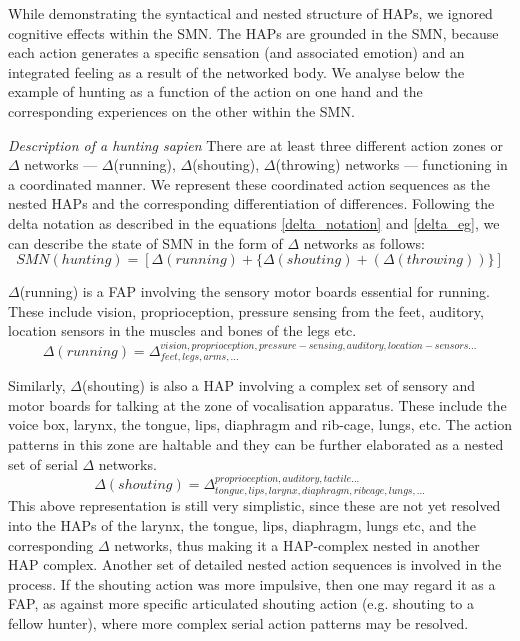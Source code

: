 While demonstrating the syntactical and nested structure of HAPs, we ignored cognitive effects within the SMN. The HAPs are grounded in the SMN, because each action generates a specific sensation (and associated emotion) and an integrated feeling as a result of the networked body. We analyse below the example of hunting as a function of the action on one hand and the corresponding experiences on the other within the SMN.

\emph{Description of a hunting sapien}
There are at least three different action zones or $\Delta$ networks --- $\Delta$(running), $\Delta$(shouting), $\Delta$(throwing) networks --- functioning in a coordinated manner. We represent these coordinated action sequences as the nested HAPs and the corresponding differentiation of differences. Following the delta notation as described in the equations \ref{delta_notation} and \ref{delta_eg}, we can describe the state of SMN in the form of $\Delta$ networks as follows:
\begin{equation}\label{running-eq}
SMN(hunting)= [\Delta(running) + \{\Delta(shouting) + (\Delta(throwing))\}]
\end{equation}

$\Delta$(running) is a FAP involving the sensory motor boards essential for running. These include vision, proprioception, pressure sensing from the feet, auditory, location sensors in the muscles and bones of the legs etc.
\begin{equation}\label{running-eq}
\Delta(running) = \Delta^{vision, proprioception, pressure-sensing, auditory, location-sensors...}_{feet, legs, arms,...}    
\end{equation}

Similarly, $\Delta$(shouting) is also a HAP involving a complex set of sensory and motor boards for talking at the zone of vocalisation apparatus. These include the voice box, larynx, the tongue, lips, diaphragm and rib-cage, lungs, etc. The action patterns in this zone are haltable and they can be further elaborated as a nested set of serial $\Delta$ networks.
\begin{equation}\label{shouting-eq}
\Delta(shouting) = \Delta^{proprioception, auditory, tactile ...}_{tongue, lips, larynx, diaphragm, rib cage, lungs,...}    
\end{equation}
This above representation is still very simplistic, since these are not yet resolved into the HAPs of the larynx, the tongue, lips, diaphragm, lungs etc, and the corresponding $\Delta$ networks, thus making it a HAP-complex nested in another HAP complex. Another set of detailed nested action sequences is involved in the process. If the shouting action was more impulsive, then one may regard it as a FAP, as against more specific articulated shouting action (e.g. shouting to a fellow hunter), where more complex serial action patterns may be resolved.

